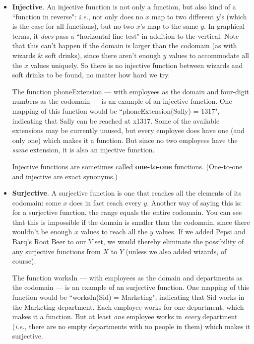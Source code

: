 \begin{itemize}

\item \textbf{Injective}. An injective function is not only a function, but
also kind of a ``function in reverse": \textit{i.e.}, not only does no $x$
map to two different $y$'s (which is the case for all functions), but no
two $x$'s map to the same $y$. In graphical terms, it \textit{does} pass a
``horizontal line test" in addition to the vertical. Note that this can't
happen if the domain is larger than the codomain (as with wizards \& soft
drinks), since there aren't enough $y$ values to accommodate all the $x$
values uniquely. So there is no injective function between wizards and soft
drinks to be found, no matter how hard we try.

The function phoneExtension --- with employees as the domain and four-digit
numbers as the codomain --- is an example of an injective function. One
mapping of this function would be ``phoneExtension(Sally) = 1317",
indicating that Sally can be reached at x1317. Some of the available
extensions may be currently unused, but every employee does have one (and
only one) which makes it a function. But since no two employees have the
\textit{same} extension, it is also an injective function.

Injective functions are sometimes called \textbf{one-to-one} functions.
(One-to-one and injective are exact synonyms.)

\item \textbf{Surjective}. A surjective function is one that reaches all
the elements of its codomain: some $x$ does in fact reach every $y$.
Another way of saying this is: for a surjective function, the range equals
the entire codomain. You can see that this is impossible if the domain is
smaller than the codomain, since there wouldn't be enough $x$ values to
reach all the $y$ values. If we added Pepsi and Barq's Root Beer to our $Y$
set, we would thereby eliminate the possibility of any surjective functions
from $X$ to $Y$ (unless we also added wizards, of course).

The function worksIn --- with employees as the domain and departments as
the codomain --- is an example of an surjective function. One mapping of
this function would be ``worksIn(Sid) = Marketing", indicating that
Sid works in the Marketing department. Each employee works for one
department, which makes it a function. But at least \textit{one} employee
works in \textit{every} department (\textit{i.e.}, there are no empty
departments with no people in them) which makes it surjective.


\end{itemize}
